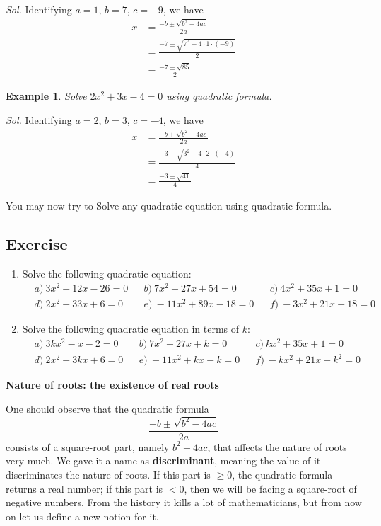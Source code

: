 \documentclass[12pt]{article}
\newtheorem{example}{Example}
\begin{document}
    \textit{ Sol.} Identifying $a=1$, $b=7$, $c=-9$, we have \begin{align*}
        x&=\frac{-b\pm\sqrt{b^2-4ac}}{2a}\\
        &=\frac{-7\pm\sqrt{7^2-4\cdot 1\cdot (-9)}}{2}\\
        &=\frac{-7\pm\sqrt{85}}{2}
    \end{align*}

    \begin{example}
        Solve $2x^2+3x-4=0$ using quadratic formula.
    \end{example}

    \textit{ Sol.} Identifying $a=2$, $b=3$, $c=-4$, we have \begin{align*}
        x&=\frac{-b\pm\sqrt{b^2-4ac}}{2a}\\
        &=\frac{-3\pm\sqrt{3^2-4\cdot 2\cdot (-4)}}{4}\\
        &=\frac{-3\pm\sqrt{41}}{4}
    \end{align*}

    You may now try to Solve any quadratic equation using quadratic formula.

    \subsection*{Exercise}

    \begin{enumerate}
        \item Solve the following quadratic equation:\begin{align*}
            &a)\ 3x^2-12x-26=0&&b)\ 7x^2-27x+54=0&&c)\ 4x^2+35x+1=0\\
            &d)\ 2x^2-33x+6=0&&e)\ -11x^2+89x-18=0&&f)\ -3x^2+21x-18=0
        \end{align*}
        \item Solve the following quadratic equation in terms of $k$:\begin{align*}
            &a)\ 3kx^2-x-2=0&&b)\ 7x^2-27x+k=0&&c)\ kx^2+35x+1=0\\
            &d)\ 2x^2-3kx+6=0&&e)\ -11x^2+kx-k=0&&f)\ -kx^2+21x-k^2=0
        \end{align*}
    \end{enumerate}

    \begin{center}
        \textbf{Nature of roots: the existence of real roots}
    \end{center}

    One should observe that the quadratic formula $$\frac{-b\pm \sqrt{b^2-4ac}}{2a}$$ consists of a square-root part, namely $b^2-4ac$, that affects the nature of roots very much. We gave it a name as \textbf{discriminant}, meaning the value of it discriminates the nature of roots. If this part is $\geq 0$, the quadratic formula returns a real number; if this part is $< 0$, then we will be facing a square-root of negative numbers. From the history it kills a lot of mathematicians, but from now on let us define a new notion for it.
\end{document}
